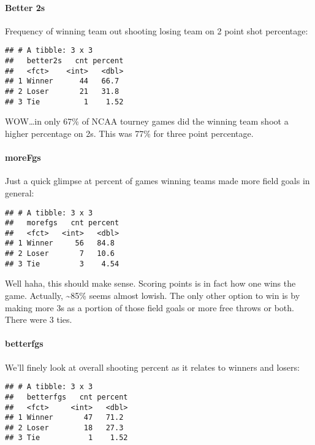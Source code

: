 \documentclass[
]{article}
\begin{document}
\hypertarget{better-2s}{%
\paragraph{Better 2s}\label{better-2s}}

Frequency of winning team out shooting losing team on 2 point shot
percentage:

\begin{verbatim}
## # A tibble: 3 x 3
##   better2s   cnt percent
##   <fct>    <int>   <dbl>
## 1 Winner      44   66.7 
## 2 Loser       21   31.8 
## 3 Tie          1    1.52
\end{verbatim}

WOW\ldots in only 67\% of NCAA tourney games did the winning team shoot
a higher percentage on 2s. This was 77\% for three point percentage.

\hypertarget{morefgs}{%
\paragraph{moreFgs}\label{morefgs}}

Just a quick glimpse at percent of games winning teams made more field
goals in general:

\begin{verbatim}
## # A tibble: 3 x 3
##   morefgs   cnt percent
##   <fct>   <int>   <dbl>
## 1 Winner     56   84.8 
## 2 Loser       7   10.6 
## 3 Tie         3    4.54
\end{verbatim}

Well haha, this should make sense. Scoring points is in fact how one
wins the game. Actually, \textasciitilde85\% seems almost lowish. The
only other option to win is by making more 3s as a portion of those
field goals or more free throws or both. There were 3 ties.

\hypertarget{betterfgs}{%
\paragraph{betterfgs}\label{betterfgs}}

We'll finely look at overall shooting percent as it relates to winners
and losers:

\begin{verbatim}
## # A tibble: 3 x 3
##   betterfgs   cnt percent
##   <fct>     <int>   <dbl>
## 1 Winner       47   71.2 
## 2 Loser        18   27.3 
## 3 Tie           1    1.52
\end{verbatim}
\end{document}
